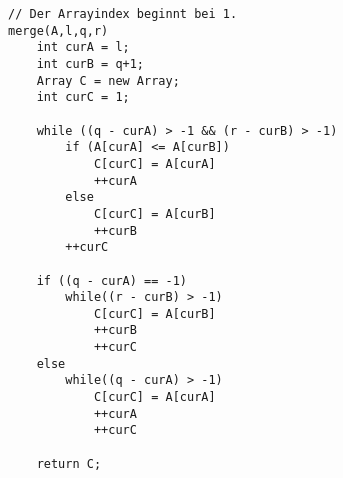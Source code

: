 \begin{verbatim}
// Der Arrayindex beginnt bei 1.
merge(A,l,q,r)
    int curA = l;
    int curB = q+1;
    Array C = new Array;
    int curC = 1;

    while ((q - curA) > -1 && (r - curB) > -1)
        if (A[curA] <= A[curB])
            C[curC] = A[curA]
            ++curA
        else
            C[curC] = A[curB]
            ++curB
        ++curC

    if ((q - curA) == -1)
        while((r - curB) > -1)
            C[curC] = A[curB]
            ++curB
            ++curC
    else
        while((q - curA) > -1)
            C[curC] = A[curA]
            ++curA
            ++curC

    return C;
\end{verbatim}